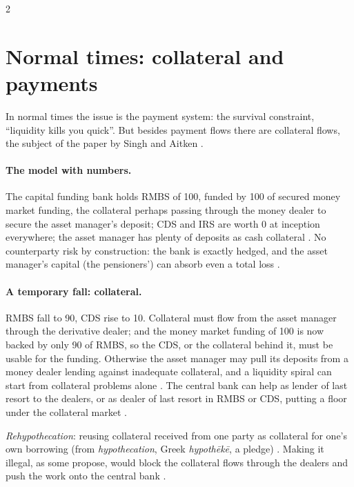 \begin{paracol}{2}
\section{Normal times: collateral and payments}\label{sec:cbs-collateral}

In normal times the issue is the payment system: the survival constraint, ``liquidity kills you quick''. But besides payment flows there are collateral flows, the
subject of the paper by Singh and Aitken .

\paragraph{The model with numbers.} The capital funding bank holds RMBS of 100, funded by 100 of secured money market funding, the collateral perhaps passing through
the money dealer to secure the asset manager's deposit; CDS and IRS are worth 0 at inception everywhere; the asset manager has plenty of deposits as cash collateral
. No counterparty risk by construction: the bank is exactly hedged, and the asset
manager's capital (the pensioners') can absorb even a total loss .

\paragraph{A temporary fall: collateral.} RMBS fall to 90, CDS rise to 10. Collateral must flow from the asset manager through the derivative dealer; and the money market
funding of 100 is now backed by only 90 of RMBS, so the CDS, or the collateral behind it, must be usable for the funding. Otherwise the asset manager may pull its deposits
from a money dealer lending against inadequate collateral, and a liquidity spiral can start from collateral problems alone
. The central bank can help as lender of last resort to the dealers, or
as dealer of last resort in RMBS or CDS, putting a floor under the collateral market .

\begin{definition}
\emph{Rehypothecation}: reusing collateral received from one party as collateral for one's own borrowing (from \emph{hypothecation}, Greek \emph{hypoth\=ek\=e}, a
pledge) . Making it illegal, as some propose, would block the collateral flows through the dealers and push the work onto the central bank
.
\end{definition}


\end{paracol}
